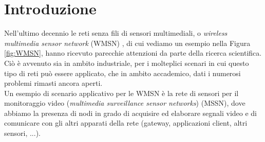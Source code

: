 \chapter{Introduzione}
\label{Introduzione}
\thispagestyle{empty}

Nell'ultimo decennio le reti senza fili di sensori multimediali, o \textit{wireless multimedia sensor network} (WMSN) \cite{akyildiz2007survey}, di cui vediamo un esempio nella Figura \ref{fig:WMSN}, hanno ricevuto parecchie attenzioni da parte della ricerca scientifica.
Ci\`o \`e avvenuto sia in ambito industriale, per i molteplici scenari in cui questo tipo di reti pu\`o essere applicato, che in ambito accademico, dati i numerosi problemi rimasti ancora aperti.\\
Un esempio di scenario applicativo per le WMSN \`e la rete di sensori per il monitoraggio video (\textit{multimedia surveillance sensor networks}) (MSSN), dove abbiamo la presenza di nodi in grado di acquisire ed elaborare segnali video e di comunicare con gli altri apparati della rete (gateway, applicazioni client, altri sensori, ...).
